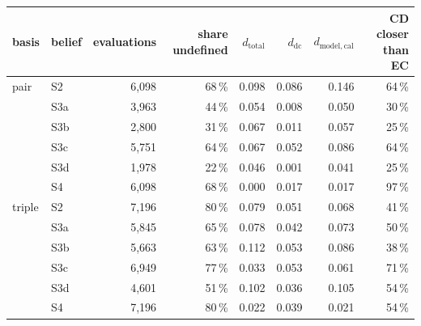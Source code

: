 \footnotesize
\begin{tabular}{llrrrrrr}
\toprule
basis & belief & evaluations & share undefined & $d_{\mathrm{total}}$ & $d_{\mathrm{dc}}$ & $d_{\mathrm{model,cal}}$ & CD closer than EC \\
\midrule
pair & S2 & 6{,}098 & 68\,\% & 0.098 & 0.086 & 0.146 & 64\,\% \\
 & S3a & 3{,}963 & 44\,\% & 0.054 & 0.008 & 0.050 & 30\,\% \\
 & S3b & 2{,}800 & 31\,\% & 0.067 & 0.011 & 0.057 & 25\,\% \\
 & S3c & 5{,}751 & 64\,\% & 0.067 & 0.052 & 0.086 & 64\,\% \\
 & S3d & 1{,}978 & 22\,\% & 0.046 & 0.001 & 0.041 & 25\,\% \\
 & S4 & 6{,}098 & 68\,\% & 0.000 & 0.017 & 0.017 & 97\,\% \\
\midrule
triple & S2 & 7{,}196 & 80\,\% & 0.079 & 0.051 & 0.068 & 41\,\% \\
 & S3a & 5{,}845 & 65\,\% & 0.078 & 0.042 & 0.073 & 50\,\% \\
 & S3b & 5{,}663 & 63\,\% & 0.112 & 0.053 & 0.086 & 38\,\% \\
 & S3c & 6{,}949 & 77\,\% & 0.033 & 0.053 & 0.061 & 71\,\% \\
 & S3d & 4{,}601 & 51\,\% & 0.102 & 0.036 & 0.105 & 54\,\% \\
 & S4 & 7{,}196 & 80\,\% & 0.022 & 0.039 & 0.021 & 54\,\% \\
\bottomrule
\end{tabular}
